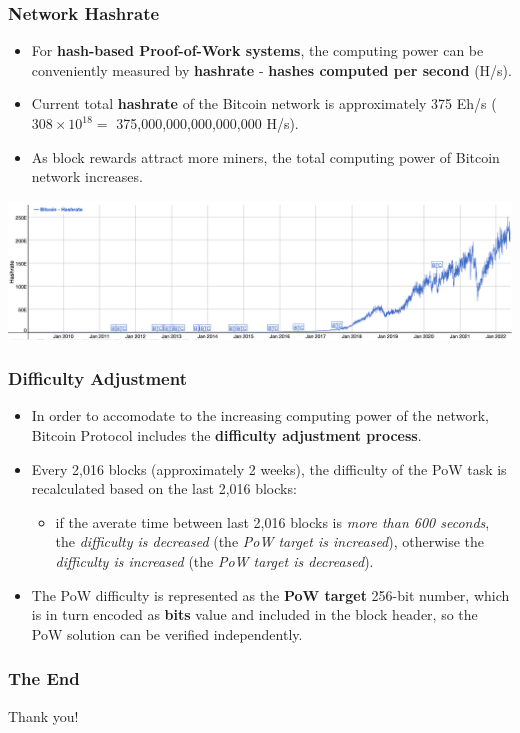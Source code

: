 \documentclass{beamer}
\begin{document}
\begin{frame}
  \frametitle{Network Hashrate}
  \begin{itemize}
  \item For \textbf{hash-based Proof-of-Work systems}, the computing power can
    be conveniently measured by \textbf{hashrate} - \textbf{hashes computed per
      second} (H/s).
  \item Current total \textbf{hashrate} of the Bitcoin network is approximately
    375 Eh/s ($308 \times 10^{18} = $ 375,000,000,000,000,000 H/s).
  \item As block rewards attract more miners, the total computing power of
    Bitcoin network increases.
  \end{itemize}
  \includegraphics[width=\textwidth]{hashrate}
\end{frame}

\begin{frame}
  \frametitle{Difficulty Adjustment}
  \begin{itemize}
  \item In order to accomodate to the increasing computing power of the network,
    Bitcoin Protocol includes the \textbf{difficulty adjustment process}.
  \item Every 2,016 blocks (approximately 2 weeks), the difficulty of the PoW
    task is recalculated based on the last 2,016 blocks:
    \begin{itemize}
    \item if the averate time between last 2,016 blocks is \textit{more than 600
        seconds}, the \textit{difficulty is decreased} (the \textit{PoW target
        is increased}), otherwise the \textit{difficulty is increased} (the
      \textit{PoW target is decreased}).
    \end{itemize}
  \item The PoW difficulty is represented as the \textbf{PoW target} 256-bit
    number, which is in turn encoded as \textbf{bits} value and included in the
    block header, so the PoW solution can be verified independently.
  \end{itemize}
\end{frame}

\begin{frame}
  \frametitle{The End}
  \begin{center}
    Thank you!
  \end{center}
\end{frame}
\end{document}
